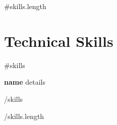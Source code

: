 \documentclass[letterpaper,11pt]{article}
\begin{document}
{{#skills.length}}
\section{Technical Skills}
 \begin{itemize}[leftmargin=0.15in, label={}, itemsep=3pt, parsep=0pt, topsep=0pt]
    {{#skills}}
    \small{\item{
      \textbf{ {{name}} }{ {{details}} } \\
    }}
    {{/skills}}
 \end{itemize}
{{/skills.length}}

\end{document}
